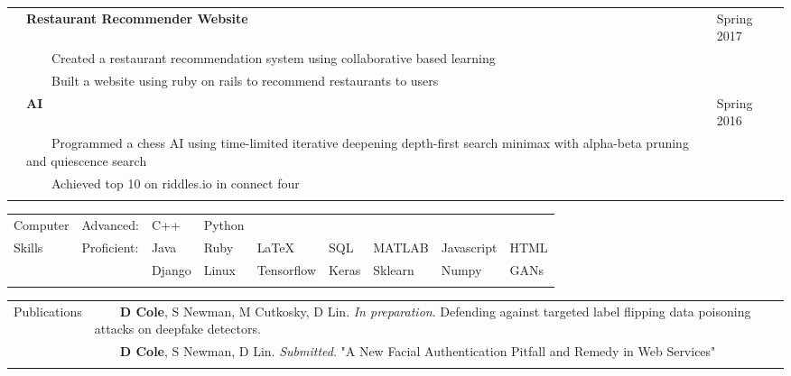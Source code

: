 \documentclass[10.5pt, arial]{article}
\newcommand{\tabitem}{~~\llap{\textbullet}~~}
\begin{document}
\begin{tabular}{p{1.5cm} p{13.2cm} l}
                & \textbf{Restaurant Recommender Website}                       & Spring 2017             \\
                & \tabitem Created a restaurant recommendation system using collaborative based learning    &   \\
                & \tabitem Built a website using ruby on rails to recommend restaurants to users            &   \\

                & \textbf{AI}                                             & Spring 2016   \\
                & \tabitem Programmed a chess AI using time-limited iterative deepening depth-first search minimax with alpha-beta pruning and quiescence search & \\
                & \tabitem Achieved top 10 on riddles.io in connect four & \\ 
\\
\end{tabular}


\begin{tabular}{p{1.5cm} l l l l l l l l}
Computer	& Advanced: 	
            & C++ 		& Python 	& 			& 			& 			& 				&       \\
Skills		& Proficient:	
            & Java 		& Ruby 		& \LaTeX 	& SQL 		& MATLAB   	& Javascript	& HTML  \\
			&			 	
            & Django 	& Linux 	& Tensorflow& Keras     & Sklearn	& Numpy	        & GANs  \\ \\ %
\end{tabular}


\begin{tabular}{p{1.5cm} p{16.5cm}}
    Publications    & \tabitem \textbf{D Cole}, S Newman, M Cutkosky, D Lin. \textit{In preparation}. Defending against targeted label flipping data poisoning attacks on deepfake detectors. \\
                    & \tabitem \textbf{D Cole}, S Newman, D Lin. \textit{Submitted}. "A New Facial Authentication Pitfall and Remedy in Web Services" \\ \\
\end{tabular}
\end{document}
